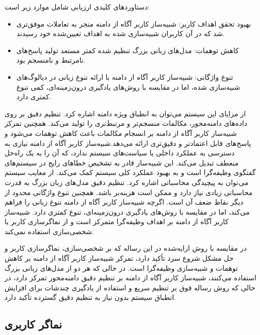 \begin{enumerate}
دستاوردهای کلیدی ارزیابی شامل موارد زیر است:
\begin{itemize}
\item
بهبود تحقق اهداف کاربر: شبیه‌ساز کاربر آگاه از دامنه منجر به تعاملات موفق‌تری شد که در آن کاربران شبیه‌سازی شده به اهداف تعیین‌شده خود رسیدند.
\item
کاهش توهمات: مدل‌های زبانی بزرگ  تنظیم شده کمتر مستعد تولید پاسخ‌های نامرتبط و نامنسجم بود.
\item
تنوع واژگانی: شبیه‌ساز کاربر آگاه از دامنه با ارائه تنوع زبانی در دیالوگ‌های شبیه‌سازی شده، اما در مقایسه با روش‌های یادگیری درون‌زمینه‌ای، کمی تنوع کمتری دارد.
\end{itemize}
از مزایای این سیستم می‌توان به انطباق ویژه دامنه اشاره کرد. تنظیم دقیق بر روی داده‌های دامنه‌محور، مکالمات منسجم‌تر و مرتبط‌تری را تولید می‌کند. همچنین تمرکز شبیه‌ساز کاربر آگاه از دامنه بر انسجام مکالمات باعث کاهش توهمات می‌شود و پاسخ‌های قابل اعتمادتر و دقیق‌تری ارائه می‌دهد.شبیه‌ساز کاربر آگاه از دامنه نیازی به دسترسی به عملکرد داخلی یا سیاست‌های سیستم ندارد، که آن را به یک راه‌حل منعطف تبدیل می‌کند. این شبیه‌ساز قادر به تشخیص خطاهای رایج در سیستم‌های گفتگوی وظیفه‌گرا است و به بهبود عملکرد کلی سیستم کمک می‌کند.
\newline
از معایب سیستم 
\cite{sekulic2024reliable}
 می توان به پیچیدگی محاسباتی اشاره کرد. تنظیم دقیق مدل‌های زبان بزرگ به قدرت محاسباتی زیادی نیاز دارد و ممکن است هزینه‌بر باشد.
همچنین تنوع واژگانی محدود از دیگر نقاط ضعف آن است. اگرچه شبیه‌ساز کاربر آگاه از دامنه تنوع زبانی را فراهم می‌کند، اما در مقایسه با روش‌های یادگیری درون‌زمینه‌ای، تنوع کمتری دارد. شبیه‌ساز کاربر آگاه از دامنه بر اهداف وظیفه‌گرا متمرکز است و از نماگر‌سازی کاربر یا شخصی‌سازی استفاده نمی‌کند.

در مقایسه با روش ارایه‌شده در این رساله که بر شخصی‌سازی، نماگر‌سازی کاربر و حل مشکل شروع سرد تأکید دارد، تمرکز 
\cite{sekulic2024reliable}
 شبیه‌ساز کاربر آگاه از دامنه  بر کاهش توهمات و شبیه‌سازی وظیفه‌گرا است. در حالی که هر دو از مدل‌های زبانی بزرگ استفاده می‌کنند، شبیه‌ساز کاربر آگاه از دامنه  بر تنظیم دقیق دامنه‌محور تمرکز دارد، در حالی که روش رساله فوق بر تنظیم سریع و استفاده از یادگیری چند‌شات برای افزایش انطباق سیستم بدون نیاز به تنظیم دقیق گسترده تأکید دارد.

\end{enumerate}

\subsection{نماگر کاربری}
